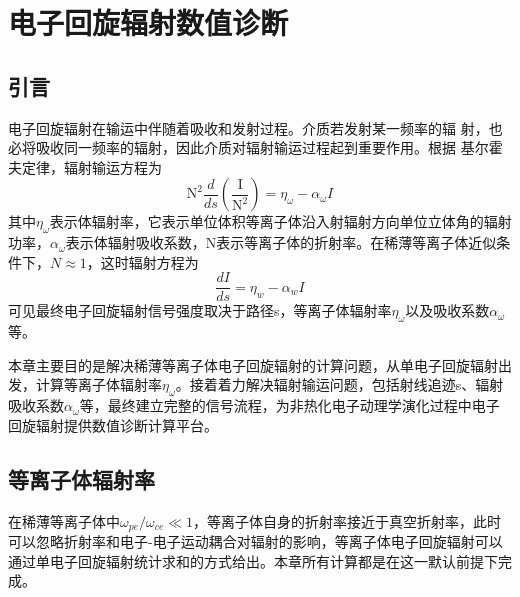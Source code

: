 \chapter{电子回旋辐射数值诊断}
\section*{引言}
电子回旋辐射在输运中伴随着吸收和发射过程。介质若发射某一频率的辐
射，也必将吸收同一频率的辐射，因此介质对辐射输运过程起到重要作用。根据
基尔霍夫定律，辐射输运方程为
\begin{equation}
\mathrm{N}^{2} \frac{d}{d s}\left(\frac{\mathrm{I}}{\mathrm{N}^{2}}\right)=\eta_{\omega}-\alpha_{\omega} I
\end{equation}
其中$η_\omega$表示体辐射率，它表示单位体积等离子体沿入射辐射方向单位立体角的辐射功率，$α_\omega$表示体辐射吸收系数，N表示等离子体的折射率。在稀薄等离子体近似条件下，$N≈1$，这时辐射方程为
\begin{equation}\label{eq:dids}
\frac{d I}{d s}=\eta_{w}-\alpha_{w} I
\end{equation}
可见最终电子回旋辐射信号强度取决于路径s，等离子体辐射率$η_\omega$以及吸收系数$α_\omega$等。\par
本章主要目的是解决稀薄等离子体电子回旋辐射的计算问题，从单电子回旋辐射出发，计算等离子体辐射率$η_\omega$。接着着力解决辐射输运问题，包括射线追迹s、辐射吸收系数$α_\omega$等，最终建立完整的信号流程，为非热化电子动理学演化过程中电子回旋辐射提供数值诊断计算平台。
\section{等离子体辐射率}
在稀薄等离子体中$ω_{pe}/ω_{ce} ≪1$，等离子体自身的折射率接近于真空折射率，此时可以忽略折射率和电子-电子运动耦合对辐射的影响，等离子体电子回旋辐射可以通过单电子回旋辐射统计求和的方式给出\cite{RN1898}。本章所有计算都是在这一默认前提下完成。
